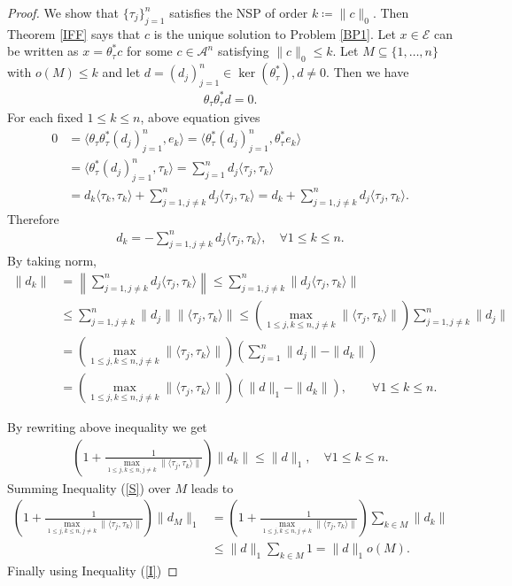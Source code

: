 \documentclass{amsart}
\begin{document}
\begin{proof}
We show that 	$\{\tau_j\}_{j=1}^n $  satisfies the  NSP of order $k\coloneqq \|c\|_0$. Then Theorem \ref{IFF} says that $c$ is the unique solution to Problem \ref{BP1}. Let  $x \in \mathcal{E}$ can be written as  $	x=\theta_\tau^* c$ for some  $c \in  \mathcal{A}^n$ satisfying $\|c\|_0\leq k$. Let $ M \subseteq   \{1, \dots, n\} $ with $o(M)\leq k$ and let $d=(d_j)_{j=1}^n \in \ker(\theta_\tau^*), d \neq 0$. Then we have 
\begin{align*}
	\theta_\tau\theta_\tau^* d=0.
\end{align*}
For each fixed $1\leq k \leq n$, above equation gives
\begin{align*}
	0&=\langle 	\theta_\tau\theta_\tau^*(d_j)_{j=1}^n, e_k \rangle=\langle 	\theta_\tau^*(d_j)_{j=1}^n, \theta_\tau^*e_k \rangle\\
	&=\langle 	\theta_\tau^*(d_j)_{j=1}^n, \tau_k \rangle
	=\sum_{j=1}^{n}d_j\langle \tau_j, \tau_k\rangle\\
	&=d_k\langle \tau_k, \tau_k\rangle+\sum_{j=1, j \neq k}^{n}d_j\langle \tau_j, \tau_k\rangle=d_k+\sum_{j=1, j \neq k}^{n}d_j\langle \tau_j, \tau_k\rangle.
\end{align*}
Therefore 
\begin{align*}
d_k=-\sum_{j=1, j\neq k}^nd_j\langle \tau_j, \tau_k\rangle, \quad \forall 1\leq k \leq n.	
\end{align*}
By taking norm,  
\begin{align*}
	\|d_k\|&=\left\|\sum_{j=1, j\neq k}^nd_j\langle \tau_j, \tau_k\rangle\right\|\leq \sum_{j=1, j\neq k}^n\|d_j\langle \tau_j, \tau_k\rangle\|\\
	&\leq \sum_{j=1, j\neq k}^n\|d_j\|\|\langle \tau_j, \tau_k\rangle\|
	\leq \left(\displaystyle\max_{1\leq j, k \leq n, j\neq k}\|\langle \tau_j, \tau_k\rangle\|\right)\sum_{j=1, j\neq k}^n\|d_j\|\\
	&=\left(\displaystyle\max_{1\leq j, k \leq n, j\neq k}\|\langle \tau_j, \tau_k\rangle\|\right)\left(\sum_{j=1}^n\|d_j\|-\|d_k\|\right)\\
	&=\left(\displaystyle\max_{1\leq j, k \leq n, j\neq k}\|\langle \tau_j, \tau_k\rangle\|\right)\left(\|d\|_1-\|d_k\|\right), \quad \quad \forall 1\leq k \leq n.
\end{align*}

By rewriting above inequality  we get
\begin{align}\label{S}
	\left(1+\frac{1}{\displaystyle\max_{1\leq j, k \leq n, j\neq k}\|\langle \tau_j, \tau_k\rangle\|}\right)\|d_k\|\leq \|d\|_1, \quad  \forall 1\leq k \leq n.
\end{align}
Summing Inequality (\ref{S}) over $M$ leads to 
\begin{align*}
		\left(1+\frac{1}{\displaystyle\max_{1\leq j, k \leq n, j\neq k}\|\langle \tau_j, \tau_k\rangle\|}\right)\|d_M\|_1&=	\left(1+\frac{1}{\displaystyle\max_{1\leq j, k \leq n, j\neq k}\|\langle \tau_j, \tau_k\rangle\|}\right)\sum_{k\in M}\|d_k\|\\
	&\leq \|d\|_1	\sum_{k \in M} 1= \|d\|_1o(M).
\end{align*}
Finally using Inequality (\ref{I})


\end{proof}
\end{document}
